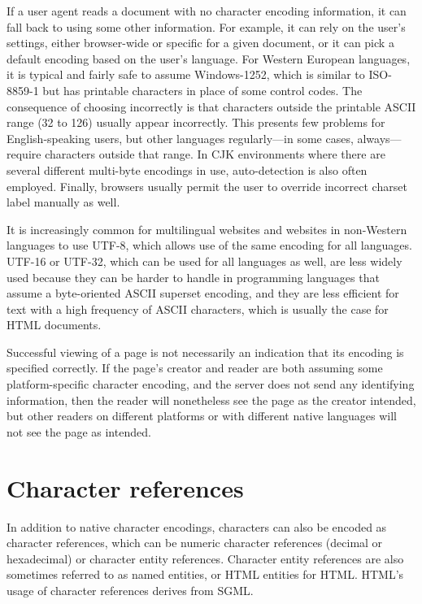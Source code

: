 If a user agent reads a document with no character encoding information, it can fall back to using some other information. For example, it can rely on the user's settings, either browser-wide or specific for a given document, or it can pick a default encoding based on the user's language. For Western European languages, it is typical and fairly safe to assume Windows-1252, which is similar to ISO-8859-1 but has printable characters in place of some control codes. The consequence of choosing incorrectly is that characters outside the printable ASCII range (32 to 126) usually appear incorrectly. This presents few problems for English-speaking users, but other languages regularly—in some cases, always—require characters outside that range. In CJK environments where there are several different multi-byte encodings in use, auto-detection is also often employed. Finally, browsers usually permit the user to override incorrect charset label manually as well.

It is increasingly common for multilingual websites and websites in non-Western languages to use UTF-8, which allows use of the same encoding for all languages. UTF-16 or UTF-32, which can be used for all languages as well, are less widely used because they can be harder to handle in programming languages that assume a byte-oriented ASCII superset encoding, and they are less efficient for text with a high frequency of ASCII characters, which is usually the case for HTML documents.

Successful viewing of a page is not necessarily an indication that its encoding is specified correctly. If the page's creator and reader are both assuming some platform-specific character encoding, and the server does not send any identifying information, then the reader will nonetheless see the page as the creator intended, but other readers on different platforms or with different native languages will not see the page as intended.



\section{Character references}


In addition to native character encodings, characters can also be encoded as character references, which can be numeric character references (decimal or hexadecimal) or character entity references. Character entity references are also sometimes referred to as named entities, or HTML entities for HTML. HTML's usage of character references derives from SGML.






